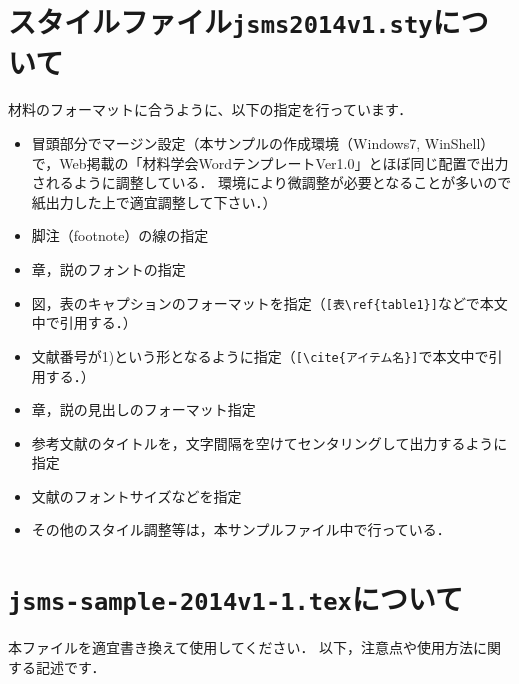 \documentclass{ujarticle}
\begin{document}
{\begin{multicols}{2}
\section{スタイルファイル{\tt jsms2014v1.sty}について}

材料のフォーマットに合うように、以下の指定を行っています．

\begin{itemize}
\item 冒頭部分でマージン設定（本サンプルの作成環境（Windows7, WinShell）で，Web掲載の「材料学会WordテンプレートVer1.0」とほぼ同じ配置で出力されるように調整している．
環境により微調整が必要となることが多いので紙出力した上で適宜調整して下さい．）

\item 脚注（footnote）の線の指定

\item 章，説のフォントの指定

\item 図，表のキャプションのフォーマットを指定（\verb|[表\ref{table1}]|などで本文中で引用する．）

\item 文献番号が1)という形となるように指定（\verb|[\cite{アイテム名}]|で本文中で引用する．）

\item 章，説の見出しのフォーマット指定

\item 参考文献のタイトルを，文字間隔を空けてセンタリングして出力するように指定

\item 文献のフォントサイズなどを指定

\item その他のスタイル調整等は，本サンプルファイル中で行っている．
\end{itemize}

\section{{\tt jsms-sample-2014v1-1.tex}について}

本ファイルを適宜書き換えて使用してください．
以下，注意点や使用方法に関する記述です．


\end{multicols}}
\end{document}
